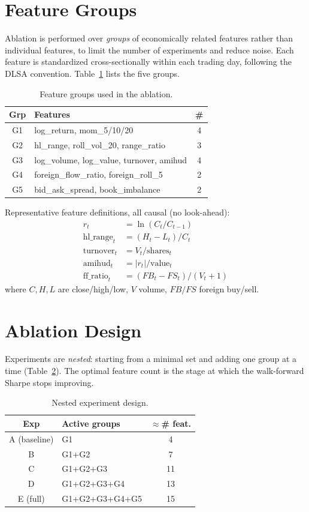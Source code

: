 \documentclass[10pt,twocolumn]{article}
\begin{document}
\section{Feature Groups}
Ablation is performed over \emph{groups} of economically related
features rather than individual features, to limit the number of
experiments and reduce noise. Each feature is standardized
cross-sectionally within each trading day, following the DLSA
convention. Table~\ref{tab:groups} lists the five groups.

\begin{table}[t]
\centering
\small
\caption{Feature groups used in the ablation.}
\label{tab:groups}
\begin{tabular}{@{}clc@{}}
\toprule
Grp & Features & \# \\
\midrule
G1 & log\_return, mom\_5/10/20 & 4 \\
G2 & hl\_range, roll\_vol\_20, range\_ratio & 3 \\
G3 & log\_volume, log\_value, turnover, amihud & 4 \\
G4 & foreign\_flow\_ratio, foreign\_roll\_5 & 2 \\
G5 & bid\_ask\_spread, book\_imbalance & 2 \\
\bottomrule
\end{tabular}
\end{table}

Representative feature definitions, all causal (no look-ahead):
\begin{align}
r_t &= \ln(C_t / C_{t-1}) \\
\text{hl\_range}_t &= (H_t - L_t)/C_t \\
\text{turnover}_t &= V_t / \text{shares}_t \\
\text{amihud}_t &= |r_t| / \text{value}_t \\
\text{ff\_ratio}_t &= (FB_t - FS_t)/(V_t + 1)
\end{align}
where $C,H,L$ are close/high/low, $V$ volume, $FB/FS$ foreign buy/sell.

\section{Ablation Design}
Experiments are \emph{nested}: starting from a minimal set and adding one
group at a time (Table~\ref{tab:design}). The optimal feature count is
the stage at which the walk-forward Sharpe stops improving.

\begin{table}[t]
\centering
\small
\caption{Nested experiment design.}
\label{tab:design}
\begin{tabular}{@{}clc@{}}
\toprule
Exp & Active groups & $\approx$\# feat. \\
\midrule
A (baseline) & G1 & 4 \\
B & G1+G2 & 7 \\
C & G1+G2+G3 & 11 \\
D & G1+G2+G3+G4 & 13 \\
E (full) & G1+G2+G3+G4+G5 & 15 \\
\bottomrule
\end{tabular}
\end{table}
\end{document}
